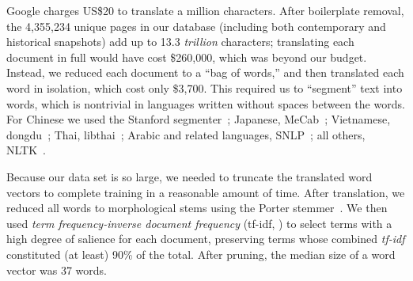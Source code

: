 Google charges US\$20 to translate a million characters.  After
boilerplate removal, the 4,355,234 unique pages in our database
(including both contemporary and historical snapshots) add up to 13.3
\emph{trillion} characters; translating each document in full would
have cost \$260,000, which was beyond our budget.  Instead, we reduced
each document to a “bag of words,” and then translated each word in
isolation, which cost only \$3,700.  This required us to “segment”
text into words, which is nontrivial in languages written
without spaces between the words.  For Chinese we used the Stanford
segmenter~\cite{chinese_segmenter}; Japanese,
MeCab~\cite{mecab_jp_segmenter}; Vietnamese,
dongdu~\cite{anh.2012.dongdu}; Thai, libthai~\cite{libthai.2001};
Arabic and related languages, SNLP~\cite{monroe.2014.arabic}; all
others, NLTK~\cite{bird.2009.nltk}.

Because our data set is so large, we needed to truncate the translated
word vectors to complete training in a reasonable amount of time.
After translation, we reduced all words to morphological stems using
the Porter stemmer~\cite{porter_stemmer_1997}. We then used
\textit{term frequency-inverse document frequency} (tf-idf,
\cite{robertson2004.tf.idf}) to select terms with a high degree of
salience for each document, preserving terms whose combined
\textit{tf-idf} constituted (at least) 90\% of the total.  After
pruning, the median size of a word vector was 37 words.

%

